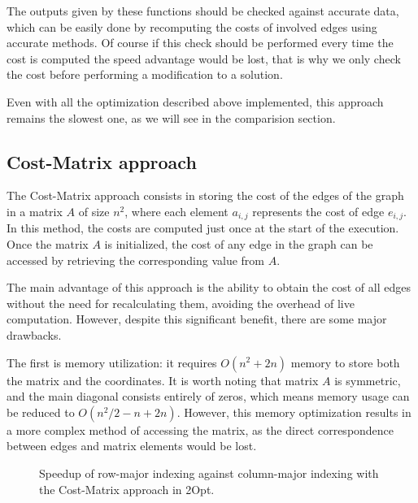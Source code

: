 The outputs given by these functions should be checked against accurate data, which can be easily done by recomputing the costs of involved edges using accurate methods.
Of course if this check should be performed every time the cost is computed the speed advantage would be lost, that is why we only check the cost before performing a modification to a solution.

Even with all the optimization described above implemented, this approach remains the slowest one, as we will see in the comparision section.

\subsection{Cost-Matrix approach}

The Cost-Matrix approach consists in storing the cost of the edges of the graph in a matrix $A$ of size $n^2$, where each element $a_{i,j}$ represents the cost of edge $e_{i,j}$.
In this method, the costs are computed just once at the start of the execution.
Once the matrix $A$ is initialized, the cost of any edge in the graph can be accessed by retrieving the corresponding value from $A$.

The main advantage of this approach is the ability to obtain the cost of all edges without the need for recalculating them, avoiding the overhead of live computation.
However, despite this significant benefit, there are some major drawbacks.

The first is memory utilization: it requires $O(n^2 + 2n)$ memory to store both the matrix and the coordinates.
It is worth noting that matrix $A$ is symmetric, and the main diagonal consists entirely of zeros, which means memory usage can be reduced to $O(n^2/2-n+2n)$.
However, this memory optimization results in a more complex method of accessing the matrix, as the direct correspondence between edges and matrix elements would be lost.

\begin{figure}[htbp]
    \centering
    \caption{Speedup of row-major indexing against column-major indexing with the Cost-Matrix approach in 2Opt.} \label{fig:matrixBadIndex}
\end{figure}

